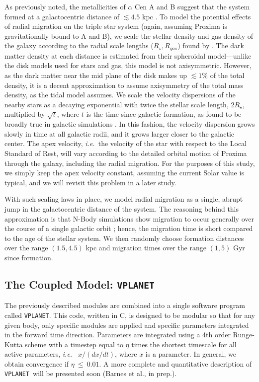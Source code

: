 \documentclass[preprint,12pt]{aastex}
\def\ie{{\it i.e.\ }}
\def\vplanet{\texttt{\footnotesize{VPLANET}}\xspace}
\begin{document}
As previously noted, the metallicities of $\alpha$ Cen A and B 
suggest that the system formed at a galactocentric distance of 
$\lesssim 4.5$ kpc \citep{Loebman16}. To model the potential 
effects of radial migration on the triple star system (again, 
assuming Proxima is gravitationally bound to A and B), we 
scale the stellar density and gas density of the galaxy 
according to the radial scale lengths ($R_{\star}, R_{gas}$) found
by \cite{Kordopatis15}. The dark matter density at each distance 
is estimated from their spheroidal model---unlike the disk models 
used for stars and gas, this model is not axisymmetric. However, 
as the dark matter near the mid plane of the disk makes up 
$\lesssim 1\%$ of the total density, it is a decent approximation 
to assume axisymmetry of the total mass density, as the 
\cite{Heisler1986} tidal model assumes. We scale the velocity 
dispersions of the nearby stars as a decaying exponential 
with twice the stellar scale length, $2R_{\star}$, multiplied by 
$\sqrt{t}$, where $t$ is the time since galactic formation, as found 
to be broadly true in galactic simulations 
\citep{Minchev2012, Roskar2012}. In this fashion, the velocity 
dispersion grows slowly in time at all galactic radii, and it grows 
larger closer to the galactic center.
The apex velocity, \ie the velocity of the star with respect to
the Local Standard of Rest, will vary according to the detailed
orbital motion
of Proxima through the galaxy, including the radial migration.  For the
purposes of this study, we
simply keep the apex velocity constant, assuming the current Solar
value is typical, and we will revisit this problem in a later study.

With such scaling laws in place, we model radial migration 
as a single, abrupt jump in the galactocentric distance of the 
system. The reasoning behind this approximation is that N-Body 
simulations show migration to occur generally over the 
course of a single galactic orbit \citep{Roskar2010}; hence, the 
migration time is short compared to the age of the stellar system.
We then randomly choose formation distances over the range 
$(1.5,4.5)$ kpc and migration times over the range $(1,5)$ Gyr 
since formation.

\subsection{The Coupled Model: \vplanet}
\label{sec:models:vplanet}
The previously described modules are combined into a single software program
called \vplanet. This code, written in C, is designed to be
modular so that for any given body, only specific modules are applied
and specific parameters integrated in the forward time direction. 
Parameters are integrated
using a 4th order Runge-Kutta scheme with a timestep equal to $\eta$
times the shortest timescale for all active parameters, \ie
$x/(dx/dt)$, where $x$ is a parameter. In general, we obtain convergence if
$\eta~\le~0.01$. A more complete and quantitative description of
\vplanet~will be presented soon (Barnes et al., in prep.). 
\end{document}
